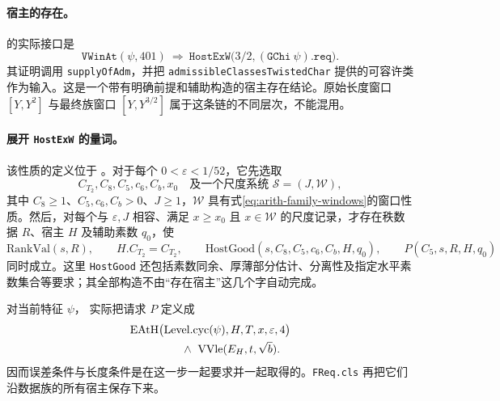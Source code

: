 \paragraph{宿主的存在。}
 的实际接口是
\[
\texttt{VWinAt}(\psi,401)
\ \Longrightarrow\
\texttt{HostExW}\bigl(3/2,(\texttt{GChi}\ \psi).\texttt{req}\bigr).
\]
其证明调用 \texttt{supplyOfAdm}，并把 \texttt{admissibleClassesTwistedChar} 提供的可容许类作为输入。这是一个带有明确前提和辅助构造的宿主存在结论。原始长度窗口 $[Y,Y^2]$ 与最终族窗口 $[Y,Y^{3/2}]$ 属于这条链的不同层次，不能混用。

\paragraph{展开 \texttt{HostExW} 的量词。}
该性质的定义位于 。对于每个 $0<\varepsilon<1/52$，它先选取
\[
C_{T_2},C_8,C_5,c_6,C_b,x_0
\quad\text{及一个尺度系统 }\mathcal S=(J,\mathcal W),
\]
其中 $C_8\ge1$、$C_5,c_6,C_b>0$、$J\ge1$，$\mathcal W$ 具有式\eqref{eq:arith-family-windows}的窗口性质。然后，对每个与 $\varepsilon,J$ 相容、满足 $x\ge x_0$ 且 $x\in\mathcal W$ 的尺度记录，才存在秩数据 $R$、宿主 $H$ 及辅助素数 $q_0$，使
\[
\mathrm{RankVal}(s,R),\qquad
H.C_{T_2}=C_{T_2},\qquad
\mathrm{HostGood}(s,C_8,C_5,c_6,C_b,H,q_0),\qquad P(C_5,s,R,H,q_0)
\]
同时成立。这里 \texttt{HostGood} 还包括素数同余、厚薄部分估计、分离性及指定水平素数集合等要求；其全部构造不由“存在宿主”这几个字自动完成。

对当前特征 $\psi$， 实际把请求 $P$ 定义成
\begin{equation}
\begin{split}
&\mathrm{EAtH}\bigl(\mathrm{Level.cyc}(\psi),H,T,x,\varepsilon,4\bigr)\\
&\hspace{16mm}\land\ \mathrm{VVle}(E_H,t,\sqrt b).
\end{split}
\label{eq:arith-gchi-request}
\end{equation}
因而误差条件与长度条件是在这一步一起要求并一起取得的。\texttt{FReq.cls} 再把它们沿数据族的所有宿主保存下来。


